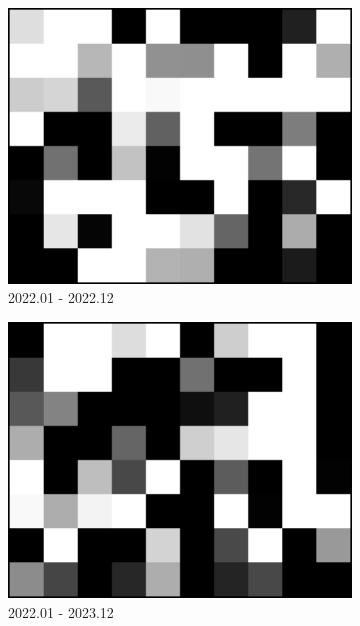 \documentclass[preprint, authoryear]{elsarticle}
\begin{document}
\begin{figure}
\begin{subfigure}{0.3\textwidth}
        \centering
        \includegraphics[width=\textwidth]{figure/The azimuth shift/shift_TaklimakanDesert_asc_20221221.png}
        \caption{2022.01 - 2022.12}
        \label{fig_7h}
    \end{subfigure}
    \begin{subfigure}{0.3\textwidth}
        \centering
        \includegraphics[width=\textwidth]{figure/The azimuth shift/shift_TaklimakanDesert_asc_20231228.png}
        \caption{2022.01 - 2023.12}
        \label{fig_7ci}
    \end{subfigure}
    \hfill
    \begin{subfigure}{0.3\textwidth}

\end{subfigure}
\end{figure}
\end{document}
